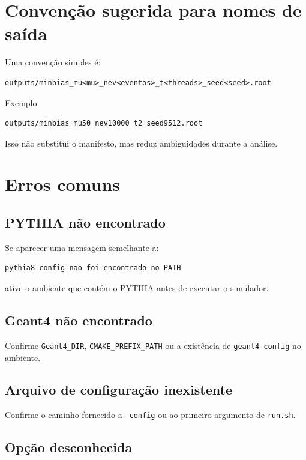 \documentclass[11pt,a4paper]{article}
\begin{document}
\section{Convenção sugerida para nomes de saída}

Uma convenção simples é:

\begin{lstlisting}[style=shell]
outputs/minbias_mu<mu>_nev<eventos>_t<threads>_seed<seed>.root
\end{lstlisting}

Exemplo:

\begin{lstlisting}[style=shell]
outputs/minbias_mu50_nev10000_t2_seed9512.root
\end{lstlisting}

Isso não substitui o manifesto, mas reduz ambiguidades durante a análise.

\section{Erros comuns}

\subsection{PYTHIA não encontrado}

Se aparecer uma mensagem semelhante a:

\begin{lstlisting}[style=shell]
pythia8-config nao foi encontrado no PATH
\end{lstlisting}

ative o ambiente que contém o PYTHIA antes de executar o simulador.

\subsection{Geant4 não encontrado}

Confirme \texttt{Geant4\_DIR}, \texttt{CMAKE\_PREFIX\_PATH} ou a existência de
\texttt{geant4-config} no ambiente.

\subsection{Arquivo de configuração inexistente}

Confirme o caminho fornecido a \texttt{--config} ou ao primeiro argumento de
\texttt{run.sh}.

\subsection{Opção desconhecida}
\end{document}

